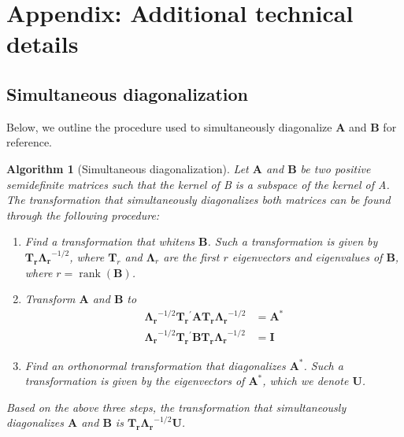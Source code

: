 \documentclass[12pt]{article} %
\newtheorem{algorithm}[theorem]{Algorithm}
\newcommand{\trans}{\ensuremath{^\prime}}
\DeclareMathOperator{\rank}{rank}
\begin{document}
\section{Appendix: Additional technical details}

\subsection{Simultaneous diagonalization}

Below, we outline the procedure used to simultaneously diagonalize $\bm{A}$ and $\bm{B}$ for reference.

\begin{algorithm}[Simultaneous diagonalization]
Let $\bm{A}$ and $\bm{B}$ be two positive semidefinite matrices such that the kernel of B is a subspace of the kernel of A. The transformation that simultaneously diagonalizes both matrices can be found through the following procedure:
\begin{enumerate}
\item Find a transformation that whitens $\bm{B}$. Such a transformation is given by $\bm{T_r \Lambda_r}^{-1/2}$, where $\bm{T}_r$ and $\bm{\Lambda}_r$ are the first $r$  eigenvectors and eigenvalues of $\bm{B}$, where $r = \rank(\bm{B})$. 

\item Transform $\bm{A}$ and $\bm{B}$ to
\begin{align}
\bm{\Lambda_r}^{-1/2} \bm{T_r}\trans \bm{A T_r \Lambda_r}^{-1/2} &= \bm{A}^* \label{eq:astar} \\
\bm{\Lambda_r}^{-1/2} \bm{T_r}\trans \bm{B T_r \Lambda_r}^{-1/2} &= \bm{I}
\end{align}

\item Find an orthonormal transformation that diagonalizes $\bm{A}^*$. Such a transformation is given by the eigenvectors of $\bm{A}^*$, which we denote $\bm{U}$.
\end{enumerate}

\noindent
Based on the above three steps, the transformation that simultaneously diagonalizes $\bm{A}$ and $\bm{B}$ is $\bm{T_r \Lambda_r}^{-1/2} \bm{U}$.\\ 
\end{algorithm}
\end{document}
